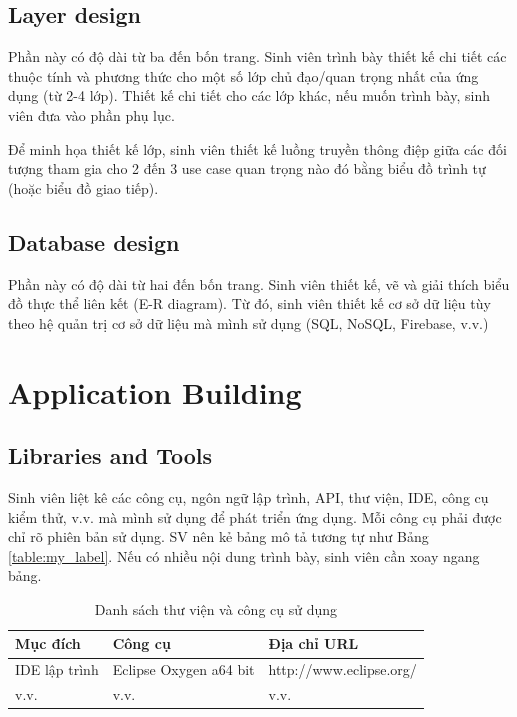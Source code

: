 \documentclass[../main.tex]{subfiles}
\begin{document}
\subsection{Layer design}
Phần này có độ dài từ ba đến bốn trang. Sinh viên trình bày thiết kế chi tiết các thuộc tính và phương thức cho một số lớp chủ đạo/quan trọng nhất của ứng dụng (từ 2-4 lớp). Thiết kế chi tiết cho các lớp khác, nếu muốn trình bày, sinh viên đưa vào phần phụ lục.

Để minh họa thiết kế lớp, sinh viên thiết kế luồng truyền thông điệp giữa các đối tượng tham gia cho 2 đến 3 use case quan trọng nào đó bằng biểu đồ trình tự (hoặc biểu đồ giao tiếp).
\subsection{Database design}
Phần này có độ dài từ hai đến bốn trang. Sinh viên thiết kế, vẽ và giải thích biểu đồ thực thể liên kết (E-R diagram). Từ đó, sinh viên thiết kế cơ sở dữ liệu tùy theo hệ quản trị cơ sở dữ liệu mà mình sử dụng (SQL, NoSQL, Firebase, v.v.)

\section{Application Building}
\subsection{Libraries and Tools}
Sinh viên liệt kê các công cụ, ngôn ngữ lập trình, API, thư viện, IDE, công cụ kiểm thử, v.v. mà mình sử dụng để phát triển ứng dụng. Mỗi công cụ phải được chỉ rõ phiên bản sử dụng. SV nên kẻ bảng mô tả tương tự như Bảng \ref{table:my_label}. Nếu có nhiều nội dung trình bày, sinh viên cần xoay ngang bảng.

\begin{table}[H]
\centering{}
    \begin{tabular}{lll}
        \hline
        \textbf{Mục đích} & \textbf{Công cụ}       & \textbf{Địa chỉ URL}    \\ \hline
        IDE lập trình     & Eclipse Oxygen a64 bit & http://www.eclipse.org/ \\ \hline
        v.v.              & v.v.                   & v.v.                    \\ \hline
        \end{tabular}
    \caption{Danh sách thư viện và công cụ sử dụng}
    \label{fig:my_label}
\end{table}
\end{document}
